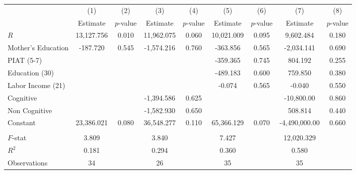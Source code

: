\begin{tabular}{lcccccccc} \toprule
 & (1) & (2) & (3) & (4) & (5) & (6) & (7) & (8) \\ 
 & Estimate  & $p$-value  & Estimate  & $p$-value  & Estimate  & $p$-value  & Estimate  & $p$-value  \\  \midrule
$R$ & 13,127.756 &     0.010 & 11,962.075 &     0.060 & 10,021.009 &     0.095 &  9,602.484 &     0.180 \\  
Mother's Education &  -187.720 &     0.545 & -1,574.216 &     0.760 &  -363.856 &     0.565 & -2,034.141 &     0.690 \\  
PIAT (5-7) &         &         &         &         &  -359.365 &     0.745 &   804.192 &     0.255 \\  
Education (30) &         &         &         &         &  -489.183 &     0.600 &   759.850 &     0.380 \\  
Labor Income (21) &         &         &         &         &    -0.074 &     0.565 &    -0.040 &     0.550 \\  
Cognitive &         &         & -1,394.586 &     0.625 &         &         & -10,800.00 &     0.860 \\  
Non Cognitive &         &         & -1,582.930 &     0.650 &         &         &   508.814 &     0.440 \\  
Constant & 23,386.021 &     0.080 & 36,548.277 &     0.110 & 65,366.129 &     0.070 & -4,490,000.00 &     0.660 \\   \\ \midrule
$F$-stat &     3.809 &         &     3.840 &         &     7.427 &         & 12,020.329 &         \\ 
$R^2$ &     0.181 &         &     0.294 &         &     0.360 &         &     0.580 &         \\  
Observations &    34 &         &    26 &         &    35 &         &    35 &         \\  
\bottomrule \end{tabular}
